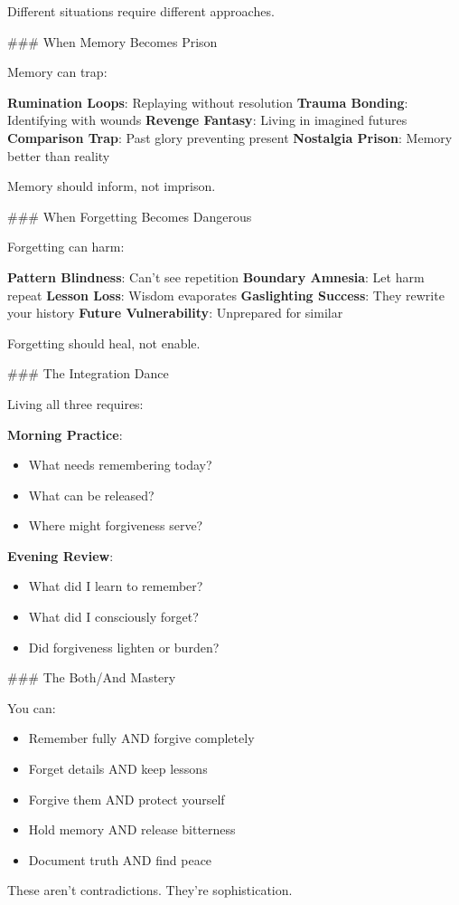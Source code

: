 \documentclass[12pt]{book}
\begin{document}
Different situations require different approaches.

\#\#\# When Memory Becomes Prison

Memory can trap:

\textbf{Rumination Loops}: Replaying without resolution
\textbf{Trauma Bonding}: Identifying with wounds
\textbf{Revenge Fantasy}: Living in imagined futures
\textbf{Comparison Trap}: Past glory preventing present
\textbf{Nostalgia Prison}: Memory better than reality

Memory should inform, not imprison.

\#\#\# When Forgetting Becomes Dangerous

Forgetting can harm:

\textbf{Pattern Blindness}: Can't see repetition
\textbf{Boundary Amnesia}: Let harm repeat
\textbf{Lesson Loss}: Wisdom evaporates
\textbf{Gaslighting Success}: They rewrite your history
\textbf{Future Vulnerability}: Unprepared for similar

Forgetting should heal, not enable.

\#\#\# The Integration Dance

Living all three requires:

\textbf{Morning Practice}:
\begin{itemize}
\item What needs remembering today?
\item What can be released?
\item Where might forgiveness serve?

\end{itemize}
\textbf{Evening Review}:
\begin{itemize}
\item What did I learn to remember?
\item What did I consciously forget?
\item Did forgiveness lighten or burden?

\end{itemize}
\#\#\# The Both/And Mastery

You can:
\begin{itemize}
\item Remember fully AND forgive completely
\item Forget details AND keep lessons
\item Forgive them AND protect yourself
\item Hold memory AND release bitterness
\item Document truth AND find peace

\end{itemize}
These aren't contradictions. They're sophistication.
\end{document}
